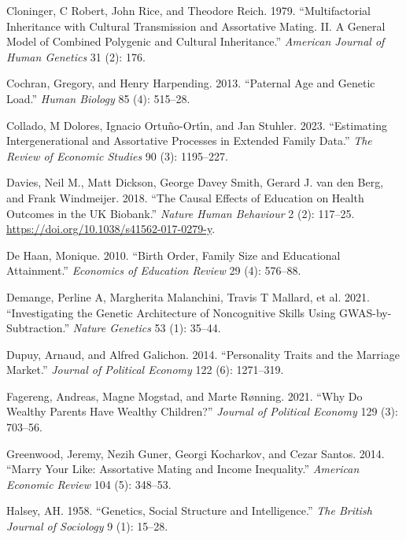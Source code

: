 \documentclass[
  12pt,
]{article}
\newlength{\cslhangindent}
\newenvironment{CSLReferences}[2] %
 {\begin{list}{}{%
  \setlength{\itemindent}{0pt}
  \setlength{\leftmargin}{0pt}
  \setlength{\parsep}{0pt}
  \ifodd #1
   \setlength{\leftmargin}{\cslhangindent}
   \setlength{\itemindent}{-1\cslhangindent}
  \fi
  \setlength{\itemsep}{#2\baselineskip}}}
 {\end{list}}
\theoremstyle{definition}
\theoremstyle{definition}
\theoremstyle{definition}
\theoremstyle{definition}
\theoremstyle{remark}
\begin{document}
\begin{CSLReferences}{1}{1}
Cloninger, C Robert, John Rice, and Theodore Reich. 1979. {``Multifactorial Inheritance with Cultural Transmission and Assortative Mating. II. A General Model of Combined Polygenic and Cultural Inheritance.''} \emph{American Journal of Human Genetics} 31 (2): 176.

Cochran, Gregory, and Henry Harpending. 2013. {``Paternal Age and Genetic Load.''} \emph{Human Biology} 85 (4): 515--28.

Collado, M Dolores, Ignacio Ortuño-Ortı́n, and Jan Stuhler. 2023. {``Estimating Intergenerational and Assortative Processes in Extended Family Data.''} \emph{The Review of Economic Studies} 90 (3): 1195--227.

Davies, Neil M., Matt Dickson, George Davey Smith, Gerard J. van den Berg, and Frank Windmeijer. 2018. {``The Causal Effects of Education on Health Outcomes in the {UK} Biobank.''} \emph{Nature Human Behaviour} 2 (2): 117--25. \url{https://doi.org/10.1038/s41562-017-0279-y}.

De Haan, Monique. 2010. {``Birth Order, Family Size and Educational Attainment.''} \emph{Economics of Education Review} 29 (4): 576--88.

{Demange, Perline A, Margherita Malanchini, Travis T Mallard, et al.} 2021. {``Investigating the Genetic Architecture of Noncognitive Skills Using GWAS-by-Subtraction.''} \emph{Nature Genetics} 53 (1): 35--44.

Dupuy, Arnaud, and Alfred Galichon. 2014. {``Personality Traits and the Marriage Market.''} \emph{Journal of Political Economy} 122 (6): 1271--319.

Fagereng, Andreas, Magne Mogstad, and Marte Rønning. 2021. {``Why Do Wealthy Parents Have Wealthy Children?''} \emph{Journal of Political Economy} 129 (3): 703--56.

Greenwood, Jeremy, Nezih Guner, Georgi Kocharkov, and Cezar Santos. 2014. {``Marry Your Like: Assortative Mating and Income Inequality.''} \emph{American Economic Review} 104 (5): 348--53.

Halsey, AH. 1958. {``Genetics, Social Structure and Intelligence.''} \emph{The British Journal of Sociology} 9 (1): 15--28.


\end{CSLReferences}
\end{document}
